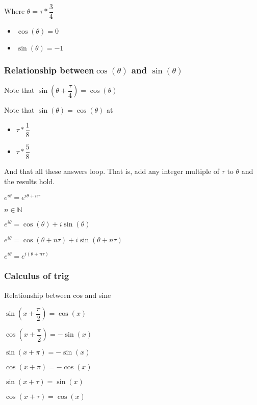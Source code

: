 Where \(\theta =\tau *\dfrac{3}{4}\)

\begin{itemize}
\item \(\cos (\theta )=0\)
\item \(\sin (\theta )=-1\)
\end{itemize}

\subsubsection{Relationship between\( \cos (\theta )\) and \(\sin(\theta )\)}

Note that \(\sin(\theta + \dfrac{\tau }{4})=\cos(\theta )\)

Note that \(\sin (\theta )=\cos (\theta )\) at

\begin{itemize}
\item \(\tau *\dfrac{1}{8}\)
\item \(\tau *\dfrac{5}{8}\)
\end{itemize}

And that all these answers loop. That is, add any integer multiple of \(\tau \) to \(\theta \) and the results hold.

\(e^{i\theta } = e^{i\theta +n\tau }\)

\(n \in \mathbb{N}\)

\(e^{i\theta } = \cos(\theta )+i\sin(\theta )\)

\(e^{i\theta } = \cos(\theta +n\tau )+i\sin(\theta +n\tau ) \)

\(e^{i\theta } = e^{i(\theta +n\tau )}\)


\subsubsection{Calculus of trig}

Relationship between cos and sine

\(\sin(x+\dfrac{\pi }{2})=\cos(x)\)

\(\cos(x+\dfrac{\pi }{2})=-\sin(x)\)

\(\sin(x+\pi )=-\sin(x)\)

\(\cos(x+\pi )=-\cos(x)\)

\(\sin(x+\tau )=\sin(x)\)

\(\cos(x+\tau )=\cos(x)\)

